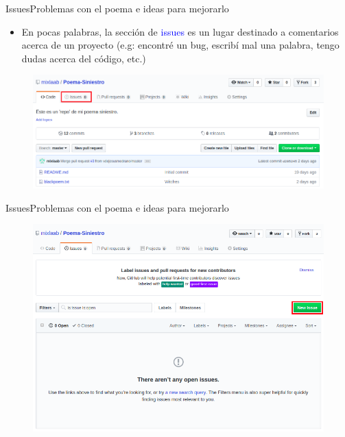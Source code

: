 \documentclass[10pt]{beamer}
\begin{document}
\begin{frame}{Issues}{Problemas con el poema e ideas para mejorarlo}

\begin{block}{}

\begin{itemize}
        \item En pocas palabras, la sección de \textcolor{blue}{issues} es un lugar destinado a comentarios acerca de un proyecto (e.g: encontré un bug, escribí mal una palabra, tengo dudas acerca del código, etc.)
\end{itemize}

\begin{figure}[h!]
\centering
\includegraphics [scale=0.27]{issues}
\label{fig:issues}
\end{figure}
    
\end{block}

\end{frame}

\begin{frame}{Issues}{Problemas con el poema e ideas para mejorarlo}

\begin{block}{}
\vspace{-0.3in}
\begin{figure}[h!]
\centering
\includegraphics [scale=0.35]{newissue}
\label{fig:issues}
\end{figure}
    
\end{block}

\end{frame}
\end{document}
